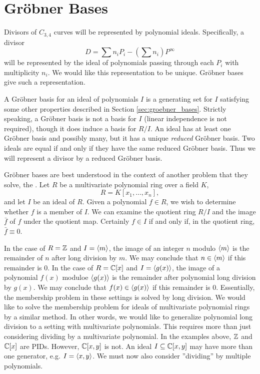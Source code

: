 

\section{Gr\"obner Bases}
\label{chap_groebner}

Divisors of $C_{3,4}$ curves will be represented by polynomial ideals.
Specifically, a divisor
\[ D = \sum n_iP_i - \left( \sum n_i \right) P^\infty \]
will be represented by the ideal of polynomials passing through each $P_i$ with multiplicity $n_i$.
We would like this representation to be unique.
Gr\"obner bases give such a representation.

A Gr\"obner basis for an ideal of polynomials $I$ is a generating set for $I$
satisfying some other properties described in Section \ref{sec:groebner_bases}.
Strictly speaking, a Gr\"obner basis is not a basis for $I$ (linear independence is not required),
though it does induce a basis for $R/I$.
An ideal has at least one Gr\"obner basis and possibly many, but it has a unique \emph{reduced} Gr\"obner basis.
Two ideals are equal if and only if they have the same reduced Gr\"obner basis.
Thus we will represent a divisor by a reduced Gr\"obner basis.

Gr\"obner bases are best understood in the context of another problem that they solve, the .
Let $R$ be a multivariate polynomial ring over a field $K$,
  \[ R = K[x_1, \ldots, x_n], \]
and let $I$ be an ideal of $R$.
Given a polynomial $f \in R$, we wish to determine whether $f$ is a member of $I$.
We can examine the quotient ring $R/I$ and the image $\bar f$ of $f$ under the quotient map.
Certainly $f \in I$ if and only if, in the quotient ring, $\bar f \equiv 0$.

In the case of $R = \mathbb{Z}$ and $I = \left\langle m \right\rangle$, the image of an integer $n$ modulo $\left\langle m \right\rangle$ is the remainder of $n$ after long division by $m$.
We may conclude that $n \in \left\langle m \right\rangle$ if this remainder is 0.
In the case of $R = \mathbb{C}[x]$ and $I = \left\langle g(x) \right\rangle$, the image of a polynomial $f(x)$ moduloe $\left\langle g(x) \right\rangle$
is the remainder after polynomial long division by $g(x)$.
We may conclude that $f(x) \in \left\langle g(x) \right\rangle$ if this remainder is 0.
Essentially, the membership problem in these settings is solved by long division.
We would like to solve the membership problem for ideals of multivariate polynomial rings by a similar method.
In other words, we would like to generalize polynomial long division to a setting with multivariate polynomials.
This requires more than just considering dividing by a multivariate polynomial.
In the examples above, $\mathbb{Z}$ and $\mathbb{C}[x]$ are PIDs.
However, $\mathbb{C}[x,y]$ is not.
An ideal $I \subseteq \mathbb{C}[x,y]$ may have more than one generator, e.g. $I = \left\langle x,y \right\rangle$.
We must now also consider ''dividing'' by multiple polynomials.

